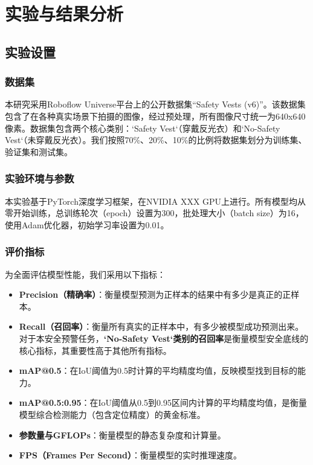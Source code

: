 \documentclass[a4paper]{ctexart}
\begin{document}
\section{实验与结果分析}

\subsection{实验设置}
\subsubsection{数据集}
本研究采用Roboflow Universe平台上的公开数据集“Safety Vests (v6)”。该数据集包含了在各种真实场景下拍摄的图像，经过预处理，所有图像尺寸统一为640x640像素。数据集包含两个核心类别：`Safety Vest`（穿戴反光衣）和`No-Safety Vest`（未穿戴反光衣）。我们按照70\%、20\%、10\%的比例将数据集划分为训练集、验证集和测试集。

\subsubsection{实验环境与参数}
本实验基于PyTorch深度学习框架，在NVIDIA XXX GPU上进行。所有模型均从零开始训练，总训练轮次（epoch）设置为300，批处理大小（batch size）为16，使用Adam优化器，初始学习率设置为0.01。

\subsubsection{评价指标}
为全面评估模型性能，我们采用以下指标：
\begin{itemize}
    \item \textbf{Precision（精确率）}：衡量模型预测为正样本的结果中有多少是真正的正样本。
    \item \textbf{Recall（召回率）}：衡量所有真实的正样本中，有多少被模型成功预测出来。对于本安全预警任务，\textbf{`No-Safety Vest`类别的召回率}是衡量模型安全底线的核心指标，其重要性高于其他所有指标。
    \item \textbf{mAP@0.5}：在IoU阈值为0.5时计算的平均精度均值，反映模型找到目标的能力。
    \item \textbf{mAP@0.5:0.95}：在IoU阈值从0.5到0.95区间内计算的平均精度均值，是衡量模型综合检测能力（包含定位精度）的黄金标准。
    \item \textbf{参数量与GFLOPs}：衡量模型的静态复杂度和计算量。
    \item \textbf{FPS（Frames Per Second）}：衡量模型的实时推理速度。
\end{itemize}
\end{document}
